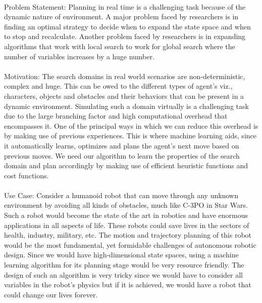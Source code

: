 \documentclass[tog]{acmsiggraph}
\begin{document}
\paragraph{}
Problem Statement: Planning in real time is a challenging task because of the dynamic nature of environment. A major problem faced by researchers is in finding an optimal strategy to decide when to expand the state space and when to stop and recalculate. Another problem faced by researchers is in expanding algorithms that work with local search to work for global search where the number of variables increases by a huge number.
\paragraph{}
Motivation: The search domains in real world scenarios are non-deterministic, complex and huge. This can be owed to the different types of agent’s viz., characters, objects and obstacles and their behaviors that can be present in a dynamic environment. Simulating such a domain virtually is a challenging task due to the large branching factor and high computational overhead that encompasses it. One of the principal ways in which we can reduce this overhead is by making use of previous experiences. This is where machine learning aids, since it automatically learns, optimizes and plans the agent’s next move based on previous moves. We need our algorithm to learn the properties of the search domain and plan accordingly by making use of efficient heuristic functions and cost functions.
\paragraph{}
Use Case: Consider a humanoid robot that can move through any unknown environment by avoiding all kinds of obstacles, much like C-3PO in Star Wars. Such a robot would become the state of the art in robotics and have enormous applications in all aspects of life. These robots could save lives in the sectors of health, industry, military, etc. The motion and trajectory planning of this robot would be the most fundamental, yet formidable challenges of autonomous robotic design. Since we would have high-dimensional state spaces, using a machine learning algorithm for its planning stage would be very resource friendly. The design of such an algorithm is very tricky since we would have to consider all variables in the robot’s physics but if it is achieved, we would have a robot that could change our lives forever.

\end{document}
